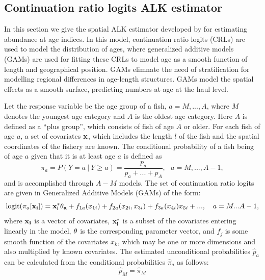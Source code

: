 \documentclass[a4paper 12pt]{article}
\numberwithin{equation}{section}
\begin{document}
\subsection{\large Continuation ratio logits ALK estimator}
\label{sec:BergModel}
In this section we give the spatial ALK estimator developed by \citet{berg2012spatial} for estimating abundance at age indices. In this model, continuation ratio logits (CRLs) are used to model the distribution of ages, where generalized additive models (GAMs) are used for fitting these CRLs to model age as a smooth function of length and geographical position. GAMs elimnate the need of stratification for modelling regional differences in age-length structures. GAMs model the spatial effects as a smooth surface, predicting numbers-at-age at the haul level. 

Let the response variable be the age group of a fish, $a = M,...,A$, where $M$ denotes the youngest age category and $A$ is the oldest age category. Here $A$ is defined as a ``plus group'', which consists of fish of age $A$ or older. For each fish of age $a$, a set of covariates $\bf x$, which includes the length $l$ of the fish and the spatial coordinates of the fishery are known. The conditional probability of a fish being of age $a$ given that it is at least age $a$ is defined as 
\begin{equation}
\pi_{a} = P(Y = a \ | \ Y \ge a) = \frac{p_{a}}{p_{a} +...+ p_{A}},  \ \ \ a=M,..., A-1,
\label{eq:bergsprobability}
\end{equation}
and is accomplished through $A-M$ models. The set of continuation ratio logits are given in Generalized Additive Models (GAMs) of the form:
\begin{equation}
\mathrm{logit}(\pi_{a}  [{\bf x_{i}}]) = {\bf x_{i}^{*}} {\bf \theta_{a}} + f_{1a}(x_{1i}) + f_{2a}(x_{2i}, x_{3i}) + f_{3a}(x_{4i})x_{5i} +...,  \ \  \  a = M...A-1,
\label{eq:linearpredictorberg}
\end{equation}
where $\bf x_{i}$ is a vector of covariates, $\bf x_{i}^{*}$ is a subset of the covariates entering linearly in the model, $\bf \theta$ is the corresponding parameter vector, and $f_{j}$ is some smooth function of the covariates $x_{k}$, which may be one or more dimensions and also multiplied by known covariates. The estimated unconditional probabilities $\hat{p}_{a}$ can be calculated from the conditional probabilities $\hat{\pi}_{a}$ as follows:
\begin{equation}
\hat{p}_{M}  = \hat{\pi}_{M} 
\label{eq:unconditionalBerg1}
\end{equation}
\end{document}
